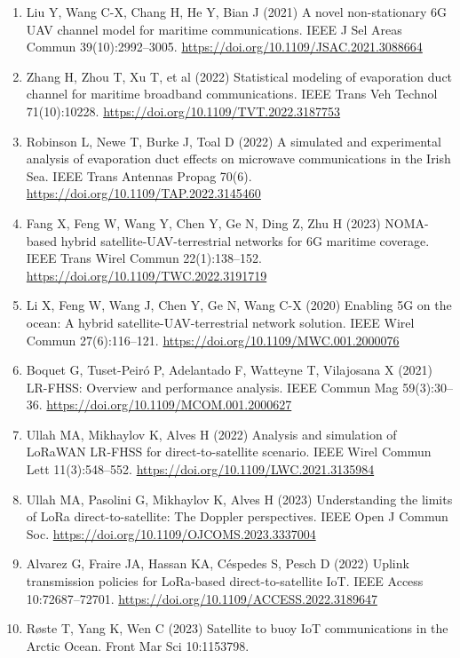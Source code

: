 \documentclass[
  11pt,
]{article}
\begin{document}
\begin{enumerate}
  Commun 70(3):2102. \url{https://doi.org/10.1109/TCOMM.2021.3134275}
\item
  Liu Y, Wang C-X, Chang H, He Y, Bian J (2021) A novel non-stationary
  6G UAV channel model for maritime communications. IEEE J Sel Areas
  Commun 39(10):2992--3005.
  \url{https://doi.org/10.1109/JSAC.2021.3088664}
\item
  Zhang H, Zhou T, Xu T, et al (2022) Statistical modeling of
  evaporation duct channel for maritime broadband communications. IEEE
  Trans Veh Technol 71(10):10228.
  \url{https://doi.org/10.1109/TVT.2022.3187753}
\item
  Robinson L, Newe T, Burke J, Toal D (2022) A simulated and
  experimental analysis of evaporation duct effects on microwave
  communications in the Irish Sea. IEEE Trans Antennas Propag 70(6).
  \url{https://doi.org/10.1109/TAP.2022.3145460}
\item
  Fang X, Feng W, Wang Y, Chen Y, Ge N, Ding Z, Zhu H (2023) NOMA-based
  hybrid satellite-UAV-terrestrial networks for 6G maritime coverage.
  IEEE Trans Wirel Commun 22(1):138--152.
  \url{https://doi.org/10.1109/TWC.2022.3191719}
\item
  Li X, Feng W, Wang J, Chen Y, Ge N, Wang C-X (2020) Enabling 5G on the
  ocean: A hybrid satellite-UAV-terrestrial network solution. IEEE Wirel
  Commun 27(6):116--121. \url{https://doi.org/10.1109/MWC.001.2000076}
\item
  Boquet G, Tuset-Peiró P, Adelantado F, Watteyne T, Vilajosana X (2021)
  LR-FHSS: Overview and performance analysis. IEEE Commun Mag
  59(3):30--36. \url{https://doi.org/10.1109/MCOM.001.2000627}
\item
  Ullah MA, Mikhaylov K, Alves H (2022) Analysis and simulation of
  LoRaWAN LR-FHSS for direct-to-satellite scenario. IEEE Wirel Commun
  Lett 11(3):548--552. \url{https://doi.org/10.1109/LWC.2021.3135984}
\item
  Ullah MA, Pasolini G, Mikhaylov K, Alves H (2023) Understanding the
  limits of LoRa direct-to-satellite: The Doppler perspectives. IEEE
  Open J Commun Soc. \url{https://doi.org/10.1109/OJCOMS.2023.3337004}
\item
  Alvarez G, Fraire JA, Hassan KA, Céspedes S, Pesch D (2022) Uplink
  transmission policies for LoRa-based direct-to-satellite IoT. IEEE
  Access 10:72687--72701.
  \url{https://doi.org/10.1109/ACCESS.2022.3189647}
\item
  Røste T, Yang K, Wen C (2023) Satellite to buoy IoT communications in
  the Arctic Ocean. Front Mar Sci 10:1153798.

\end{enumerate}
\end{document}
